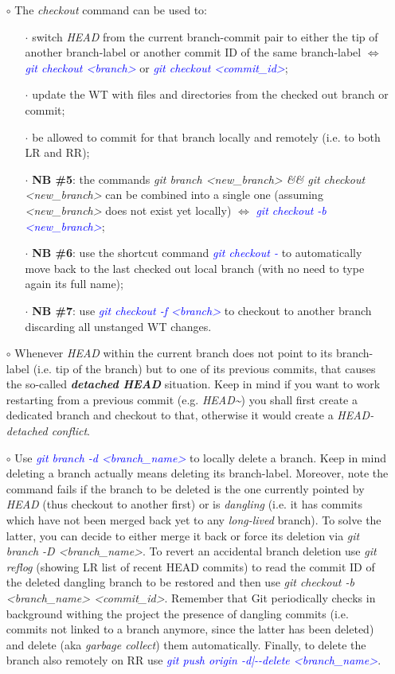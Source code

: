 \documentclass[a4paper,portrait,10pt]{article}   %
\newcommand{\mybulletlvA}{$\circ$}   %
\newcommand{\mybulletlvB}{$\cdot$}   %
\newcommand{\mydiv}{$\Leftrightarrow$ }   %
\newcommand{\mycmd}[1]{\textcolor{blue}{\textit{#1}}}   %
\newcommand{\myvspace}{\vspace{4mm}}   %
\begin{document}
\begin{itemize}
\item[\mybulletlvA] The \textit{checkout} command can be used to:
\begin{itemize}
  \item[\mybulletlvB] switch \textit{HEAD} from the current branch-commit pair to either the tip of another branch-label or another commit ID of the same branch-label \mydiv \mycmd{git checkout <branch>} or \mycmd{git checkout <commit\_id>};
  \item[\mybulletlvB] update the WT with files and directories from the checked out branch or commit;
  \item[\mybulletlvB] be allowed to commit for that branch locally and remotely (i.e. to both LR and RR);
  \item[\mybulletlvB] \textbf{NB \#5}: the commands \textit{git branch <new\_branch> \&\& git checkout <new\_branch>} can be combined into a single one (assuming \textit{<new\_branch>} does not exist yet locally) \mydiv \mycmd{git checkout -b <new\_branch>};
  \item[\mybulletlvB] \textbf{NB \#6}: use the shortcut command \mycmd{git checkout -} to automatically move back to the last checked out local branch (with no need to type again its full name);
  \item[\mybulletlvB] \textbf{NB \#7}: use \mycmd{git checkout -f <branch>} to checkout to another branch discarding all unstanged WT changes.
\end{itemize}
\myvspace

\item[\mybulletlvA] Whenever \textit{HEAD} within the current branch does not point to its branch-label (i.e. tip of the branch) but to one of its previous commits, that causes the so-called \textbf{\textit{detached HEAD}} situation. Keep in mind if you want to work restarting from a previous commit (e.g. \textit{HEAD\textasciitilde}) you shall first create a dedicated branch and checkout to that, otherwise it would create a \textit{HEAD-detached conflict}.
\myvspace

\item[\mybulletlvA] Use \mycmd{git branch -d <branch\_name>} to locally delete a branch. Keep in mind deleting a branch actually means deleting its branch-label. Moreover, note the command fails if the branch to be deleted is the one currently pointed by \textit{HEAD} (thus checkout to another first) or is \textit{dangling} (i.e. it has commits which have not been merged back yet to any \textit{long-lived} branch). To solve the latter, you can decide to either merge it back or force its deletion via \textit{git branch -D <branch\_name>}. To revert an accidental branch deletion use \textit{git reflog} (showing LR list of recent HEAD commits) to read the commit ID of the deleted dangling branch to be restored and then use \textit{git checkout -b <branch\_name> <commit\_id>}. Remember that Git periodically checks in background withing the project the presence of dangling commits (i.e. commits not linked to a branch anymore, since the latter has been deleted) and delete (aka \textit{garbage collect}) them automatically. Finally, to delete the branch also remotely on RR use \mycmd{git push origin -d|-{}-delete <branch\_name>}.
\end{itemize}
\end{document}
